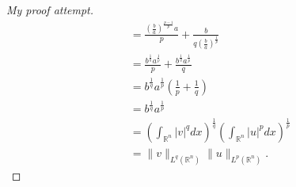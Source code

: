 \documentclass[11pt]{article}
\theoremstyle{definition}
\begin{document}
\begin{proof}[My proof attempt]
\begin{equation*}
\begin{aligned}
			       &= \frac{\left(\frac{b}{a}\right)^{\frac{p-1}{p}}a}{p} + \frac{b}{q\left(\frac{b}{a}\right)^{\frac{1}{p}}} \\
			       &= \frac{b^{\frac{1}{q}}a^{\frac{1}{p}}}{p} + \frac{b^{\frac{1}{q}}a^{\frac{1}{p}}}{q} \\
			       &= b^{\frac{1}{q}}a^{\frac{1}{p}}\left(\frac{1}{p} + \frac{1}{q}\right) \\
			       &= b^{\frac{1}{q}}a^{\frac{1}{p}} \\
			       &= \left(\int_{\mathbb{R}^n}|v|^qdx\right)^{\frac{1}{q}}\left(\int_{\mathbb{R}^n}|u|^pdx\right)^{\frac{1}{p}} \\
			       &= \|v\|_{L^q(\mathbb{R}^n)}\|u\|_{L^p(\mathbb{R}^n)}.
		\end{aligned}
	\end{equation*}
\end{proof}

\newpage
\end{document}
